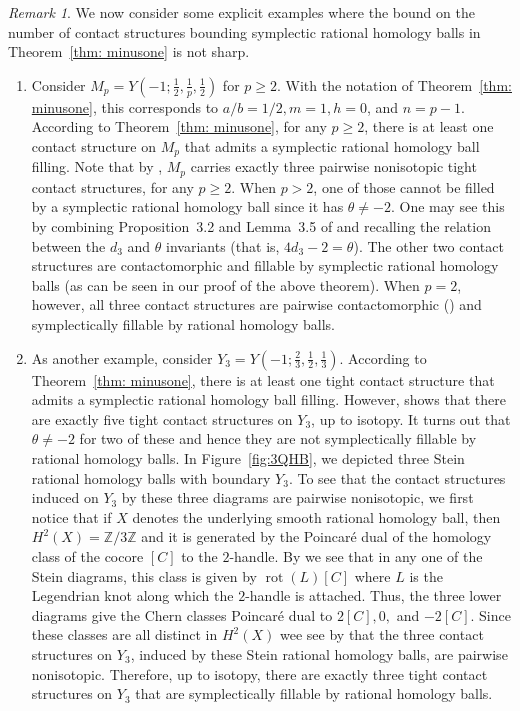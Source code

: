 \documentclass[11pt]{amsart}
\theoremstyle{plain}
\theoremstyle{definition}
\theoremstyle{remark}
\newtheorem{remark}[theorem]{Remark}
\numberwithin{theorem}{section}
\newcommand{\Z}{\mathbb{Z}}           %
\DeclareMathOperator\rot{rot}                 %
\begin{document}
\begin{remark}\label{extra}
We now consider some explicit examples where the bound on the number of contact structures bounding symplectic rational homology balls in Theorem~\ref{thm: minusone} is not sharp.
\begin{enumerate} 
\item  Consider $M_p=Y(-1; \frac{1}{2}, \frac{1}{p}, \frac{1}{2})$ for $p\geq 2$. With the notation of Theorem~\ref{thm: minusone},  this corresponds to $a/b=1/2, m=1, h=0$, and $n=p-1$.  According to Theorem~\ref{thm: minusone}, for any $p \geq 2$, there is at least one contact structure on $M_p$ that admits a symplectic rational homology ball filling. Note that by \cite[Remark~3.12]{GhigginiLiscaStipsicz07}, $M_p$ carries exactly three pairwise nonisotopic tight contact structures, for any $p\geq 2$. When $p>2$, one of those cannot be filled by a symplectic rational homology ball since it has $\theta\neq -2$. One may see this by combining Proposition~3.2 and Lemma~3.5 of \cite{GhigginiLiscaStipsicz07} and recalling the relation between the $d_3$ and $\theta$ invariants (that is, $4d_3-2=\theta$). The other two contact structures are contactomorphic and fillable by symplectic rational homology balls (as can be seen in our proof of the above theorem). 
 When $p=2$, however,  all three contact structures are pairwise contactomorphic (\cite[Section~$3.3$]{GhigginiLiscaStipsicz07}) and symplectically fillable by rational homology balls.



\item As another example, consider $Y_3=Y(-1; \frac{2}{3},  \frac{1}{2}, \frac{1}{3})$. According to Theorem~\ref{thm: minusone}, there is at least one tight contact structure that admits a symplectic rational homology ball filling. However, \cite{GhigginiLiscaStipsicz07} shows that there are exactly five tight contact structures on $Y_3$, up to isotopy. It turns out that $\theta \neq -2$ for two of these and hence they are not symplectically fillable by rational homology balls. In Figure~\ref{fig:3QHB}, we depicted three Stein rational homology balls with boundary $Y_3$. To see that the contact structures induced on $Y_3$ by these three diagrams are pairwise nonisotopic, we first notice that if $X$ denotes the underlying smooth rational homology ball, then $H^2(X)=\Z/3\Z$ and it is generated by the Poincar\'e dual of the homology class of the cocore $[C]$ to the $2$-handle. By \cite[Theorem~4.12]{Gompf98} we see that in any one of the Stein diagrams, this class is given by $\rot(L)[C]$ where $L$ is the Legendrian knot along which the $2$-handle is attached. Thus, the three lower diagrams give the Chern classes Poincar\'e dual to $2[C], 0,$ and $-2[C]$. Since these classes are all distinct in $H^2(X)$ wee see by \cite[Theorem~1.2]{LiscaMatic97} that the three contact structures on $Y_3$, induced by these Stein rational homology balls, are pairwise nonisotopic.  Therefore, up to isotopy,  there are exactly three tight contact structures on $Y_3$ that are symplectically fillable by rational homology balls.
\end{enumerate}
\end{remark}
\end{document}
